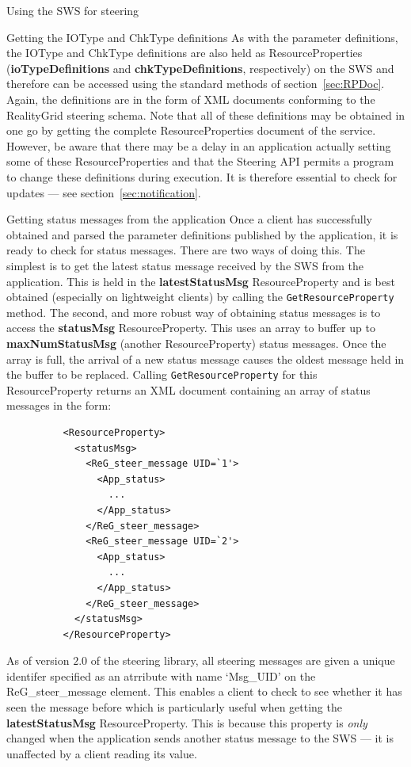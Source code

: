 \documentclass[a4paper]{article}
\begin{document}
\begin{section}{Using the SWS for steering}
\begin{subsection}{Getting the IOType and ChkType definitions}
As with the parameter definitions, the IOType and ChkType definitions
are also held as ResourceProperties ({\bf ioTypeDefinitions} and {\bf
chkTypeDefinitions}, respectively) on the SWS and therefore can be
accessed using the standard methods of section~\ref{sec:RPDoc}.
Again, the definitions are in the form of XML documents conforming to
the RealityGrid steering schema.  Note that all of these definitions
may be obtained in one go by getting the complete ResourceProperties
document of the service.  However, be aware that there may be a delay
in an application actually setting some of these ResourceProperties
and that the Steering API permits a program to change these
definitions during execution.  It is therefore essential to check for
updates --- see section~\ref{sec:notification}.
\end{subsection}

\begin{subsection}{Getting status messages from the application}
Once a client has successfully obtained and parsed the parameter
definitions published by the application, it is ready to check for
status messages.  There are two ways of doing this.  The simplest is
to get the latest status message received by the SWS from the
application.  This is held in the {\bf latestStatusMsg} ResourceProperty and
is best obtained (especially on lightweight clients) by calling the
\texttt{GetResourceProperty} method.  The second, and more robust way of
obtaining status messages is to access the {\bf statusMsg} ResourceProperty.
This uses an array to buffer up to {\bf maxNumStatusMsg} (another
ResourceProperty) status messages.  Once the array is full, the
arrival of a new status message causes the oldest message held in the
buffer to be replaced.  Calling \texttt{GetResourceProperty} for this
ResourceProperty returns an XML document containing an array of status
messages in the form:
\begin{verbatim}
          <ResourceProperty>
            <statusMsg>
              <ReG_steer_message UID=`1'>
                <App_status>
                  ...
                </App_status>
              </ReG_steer_message>
              <ReG_steer_message UID=`2'>
                <App_status>
                  ...
                </App_status>
              </ReG_steer_message>
            </statusMsg>
          </ResourceProperty>
\end{verbatim}

As of version $2.0$ of the steering library, all steering messages are
given a unique identifer specified as an atrribute with name `Msg\_UID' on
the ReG\_steer\_message element.  This enables a client to check to see
whether it has seen the message before which is particularly useful
when getting the  {\bf latestStatusMsg} ResourceProperty.  This is because
this property is {\em only} changed when the application sends another
status message to the SWS --- it is unaffected by a client reading its
value.
\end{subsection}


\end{section}
\end{document}
